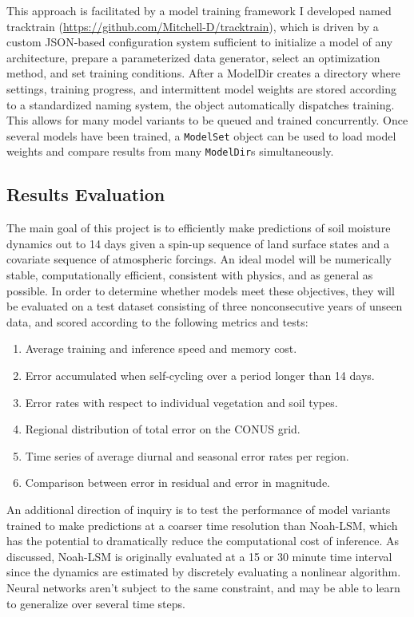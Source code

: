 \documentclass[11pt]{article}
\begin{document}
\begin{multicols}{2}
    This approach is facilitated by a model training framework I developed named tracktrain (\url{https://github.com/Mitchell-D/tracktrain}), which is driven by a custom JSON-based configuration system sufficient to initialize a model of any architecture, prepare a parameterized data generator, select an optimization method, and set training conditions. After a ModelDir creates a directory where settings, training progress, and intermittent model weights are stored according to a standardized naming system, the object automatically dispatches training.  This allows for many model variants to be queued and trained concurrently. Once several models have been trained, a \texttt{ModelSet} object can be used to load model weights and compare results from many \texttt{ModelDir}s simultaneously.

    \subsection{Results Evaluation}

    The main goal of this project is to efficiently make predictions of soil moisture dynamics out to 14 days given a spin-up sequence of land surface states and a covariate sequence of atmospheric forcings. An ideal model will be numerically stable, computationally efficient, consistent with physics, and as general as possible. In order to determine whether models meet these objectives, they will be evaluated on a test dataset consisting of three nonconsecutive years of unseen data, and scored according to the following metrics and tests:

    \begin{enumerate}
        \item Average training and inference speed and memory cost.
        \item Error accumulated when self-cycling over a period longer than 14 days.
        \item Error rates with respect to individual vegetation and soil types.
        \item Regional distribution of total error on the CONUS grid.
        \item Time series of average diurnal and seasonal error rates per region.
        \item Comparison between error in residual and error in magnitude.
    \end{enumerate}

    An additional direction of inquiry is to test the performance of model variants trained to make predictions at a coarser time resolution than Noah-LSM, which has the potential to dramatically reduce the computational cost of inference. As discussed, Noah-LSM  is originally evaluated at a 15 or 30 minute time interval since the dynamics are estimated by discretely evaluating a nonlinear algorithm. Neural networks aren't subject to the same constraint, and may be able to learn to generalize over several time steps.

\end{multicols}



\end{document}
